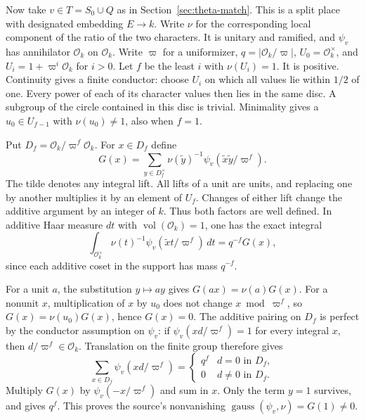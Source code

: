 Now take \(v\in T=S_0\cup Q\) as in Section~\ref{sec:theta-match}.
This is a split place with designated embedding \(E\to k\). Write
\(\nu\) for the corresponding local component of the ratio of the
two characters. It is unitary and ramified, and \(\psi_v\) has
annihilator \(\mathcal O_k\) on \(\mathcal O_k\). Write \(\varpi\)
for a uniformizer, \(q=|\mathcal O_k/\varpi|\), \(U_0=\mathcal
O_k^\times\), and \(U_i=1+\varpi^i\mathcal O_k\) for \(i>0\).
Let \(f\) be the least \(i\) with \(\nu(U_i)=1\). It is positive.
Continuity gives a finite conductor: choose \(U_i\) on which all
values lie within \(1/2\) of one. Every power of each of its
character values then lies in the same disc. A subgroup of the
circle contained in this disc is trivial. Minimality gives a
\(u_0\in U_{f-1}\) with \(\nu(u_0)\ne1\), also when \(f=1\).

Put \(D_f=\mathcal O_k/\varpi^f\mathcal O_k\). For \(x\in D_f\) define
\[
 G(x)=\sum_{y\in D_f^\times}\nu(\widetilde y)^{-1}
                     \psi_v(\widetilde x\widetilde y/\varpi^f).
\]
The tilde denotes any integral lift. All lifts of a unit are units,
and replacing one by another multiplies it by an element of \(U_f\).
Changes of either lift change the additive argument by an integer
of \(k\). Thus both factors are well defined. In additive Haar
measure \(dt\) with \(\operatorname{vol}(\mathcal O_k)=1\), one has
the exact integral
\[
 \int_{\mathcal O_k^\times}\nu(t)^{-1}
                  \psi_v(\widetilde x t/\varpi^f)\,dt=q^{-f}G(x),
\]
since each additive coset in the support has mass \(q^{-f}\).

For a unit \(a\), the substitution \(y\mapsto ay\) gives
\(G(ax)=\nu(a)G(x)\). For a nonunit \(x\), multiplication of \(x\)
by \(u_0\) does not change \(x\bmod\varpi^f\), so
\(G(x)=\nu(u_0)G(x)\), hence \(G(x)=0\).
The additive pairing on \(D_f\) is perfect by the conductor
assumption on \(\psi_v\): if
\(\psi_v(xd/\varpi^f)=1\) for every integral \(x\), then
\(d/\varpi^f\in\mathcal O_k\). Translation on the finite group
therefore gives
\[
 \sum_{x\in D_f}\psi_v(xd/\varpi^f)
     =\begin{cases}q^f&d=0\text{ in }D_f,\\0&d\ne0\text{ in }D_f.
       \end{cases}
\]
Multiply \(G(x)\) by \(\psi_v(-x/\varpi^f)\) and sum in \(x\).
Only the term \(y=1\) survives, and gives \(q^f\). This proves the
source's nonvanishing \(\operatorname{gauss}(\psi_v,\nu)=G(1)\ne0\).


